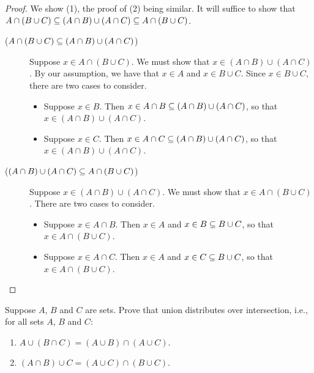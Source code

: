 \begin{proof}
We show (1), the proof of (2) being similar.
It will suffice to show that $A\cap(B\cup C)\subseteq(A\cap B)\cup(A\cap C)\subseteq
A\cap(B\cup C)$.

\begin{description}
\item[\quad($A\cap(B\cup C)\subseteq(A\cap B)\cup(A\cap C)$)] Suppose
$x\in A\cap(B\cup C)$.  We must show that
$x\in (A\cap B)\cup(A\cap C)$.
By our assumption, we have that  $x\in A$ and $x\in B\cup C$.
Since $x\in B\cup C$, there are two cases to consider.
\begin{itemize}
\item Suppose $x\in B$.  Then $x\in A\cap B\subseteq (A\cap B)\cup(A\cap C)$,
so that $x\in(A\cap B)\cup(A\cap C)$.

\item Suppose $x\in C$.  Then $x\in A\cap C\subseteq (A\cap B)\cup(A\cap C)$,
so that $x\in(A\cap B)\cup(A\cap C)$.
\end{itemize}

\item[\quad($(A\cap B)\cup(A\cap C)\subseteq A\cap(B\cup C)$)] Suppose
$x\in (A\cap B)\cup(A\cap C)$.  We must show that
$x\in A\cap(B\cup C)$.
There are two cases to consider.
\begin{itemize}
\item Suppose $x\in A\cap B$.  Then $x\in A$ and $x\in B\subseteq B\cup C$,
so that $x\in A\cap(B\cup C)$.

\item Suppose $x\in A\cap C$.  Then $x\in A$ and $x\in C\subseteq B\cup C$,
so that $x\in A\cap(B\cup C)$.
\end{itemize}
\end{description}
\end{proof}

\begin{exercise}
Suppose $A$, $B$ and $C$ are sets.  Prove that union distributes over
intersection, i.e., for all sets $A$, $B$ and $C$:
\begin{enumerate}[\quad(1)]
\item $A\cup(B\cap C)=(A\cup B)\cap(A\cup C)$.

\item $(A\cap B)\cup C=(A\cup C)\cap(B\cup C)$.
\end{enumerate}
\end{exercise}

